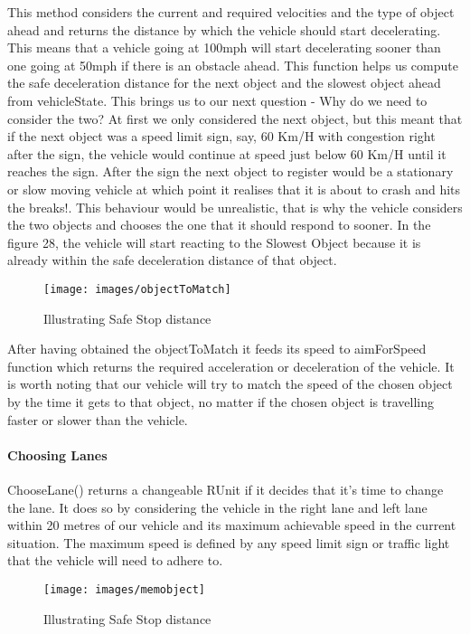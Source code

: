 \documentclass[11pt,a4paper]{article}
\begin{document}
		This method considers the current and required velocities and the type of object ahead and returns the distance by which the vehicle should start decelerating. This means that a vehicle going at 100mph will start decelerating sooner than one going at 50mph if there is an obstacle ahead.
This function helps us compute the safe deceleration distance for the next object and the slowest object ahead from vehicleState. This brings us to our next question - Why do we need to consider the two? At first we only considered the next object, but this meant that if the next object was a speed limit sign, say, 60 Km/H with congestion right after the sign, the vehicle would continue at speed just below 60 Km/H until it reaches the sign. After the sign the next object to register would be a stationary or slow moving vehicle at which point it realises that it is about to crash and hits the breaks!. This behaviour would be unrealistic, that is why the vehicle considers the two objects and chooses the one that it should respond to sooner. In the figure 28, the vehicle will start reacting to the Slowest Object because it is already within the safe deceleration distance of that object.
		
		\begin{figure}[h!]
			\texttt{[image: images/objectToMatch]}
			\caption{Illustrating Safe Stop distance}
			\centering
		\end{figure} 
	After having obtained the objectToMatch it feeds its speed to aimForSpeed function which returns the required acceleration or deceleration of the vehicle. It is worth noting that our vehicle will try to match the speed of the chosen object by the time it gets to that object, no matter if the chosen object is travelling faster or slower than the vehicle. 
		

  	\paragraph{Choosing Lanes}
  	ChooseLane() returns a changeable RUnit if it decides that it’s time to change the lane. It does so by considering the vehicle in the right lane and left lane within 20 metres of our vehicle and its maximum achievable speed in the current situation. The maximum speed is defined by any speed limit sign or traffic light that the vehicle will need to adhere to.
  	
  	\begin{figure}[h!]
			\texttt{[image: images/memobject]}
			\caption{Illustrating Safe Stop distance}
			\centering
		\end{figure} 
\end{document}
